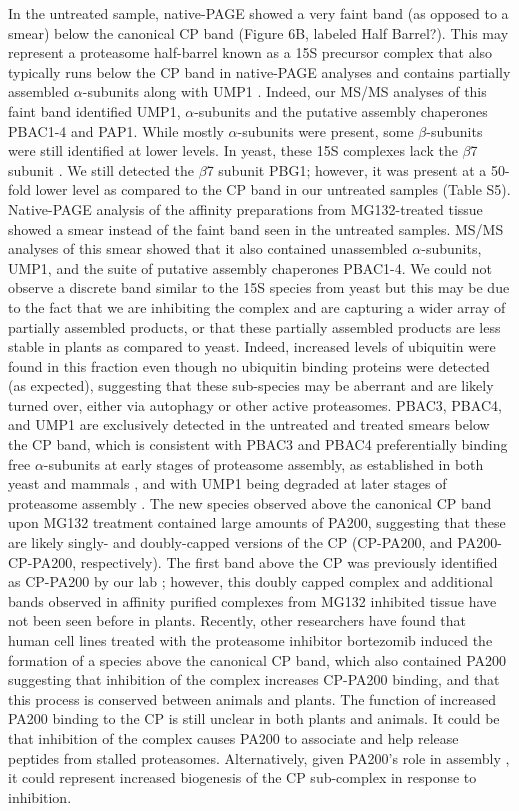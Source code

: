 In the untreated sample, native-PAGE showed a very faint band (as opposed to a smear) below the canonical CP band (Figure 6B, labeled Half Barrel?). This may represent a proteasome half-barrel known as a 15S precursor complex that also typically runs below the CP band in native-PAGE analyses and contains partially assembled $\alpha$-subunits along with UMP1 \citep{kock15}. Indeed, our MS/MS analyses of this faint band identified UMP1, $\alpha$-subunits and the putative assembly chaperones PBAC1-4 and PAP1. While mostly $\alpha$-subunits were present, some $\beta$-subunits were still identified at lower levels. In yeast, these 15S complexes lack the $\beta$7 subunit \citep{kock15}. We still detected the $\beta$7 subunit PBG1; however, it was present at a 50-fold lower level as compared to the CP band in our untreated samples (Table S5). Native-PAGE analysis of the affinity preparations from MG132-treated tissue showed a smear instead of the faint band seen in the untreated samples. MS/MS analyses of this smear showed that it also contained unassembled $\alpha$-subunits, UMP1, and the suite of putative assembly chaperones PBAC1-4. We could not observe a discrete band similar to the 15S species from yeast but this may be due to the fact that we are inhibiting the complex and are capturing a wider array of partially assembled products, or that these partially assembled products are less stable in plants as compared to yeast. Indeed, increased levels of ubiquitin were found in this fraction even though no ubiquitin binding proteins were detected (as expected), suggesting that these sub-species may be aberrant and are likely turned over, either via autophagy or other active proteasomes. PBAC3, PBAC4, and UMP1 are exclusively detected in the untreated and treated smears below the CP band, which is consistent with PBAC3 and PBAC4 preferentially binding free $\alpha$-subunits at early stages of proteasome assembly, as established in both yeast and mammals \citep{kunjappu14}, and with UMP1 being degraded at later stages of proteasome assembly \citep{ramos98}.
	The new species observed above the canonical CP band upon MG132 treatment contained large amounts of PA200, suggesting that these are likely singly- and doubly-capped versions of the CP (CP-PA200, and PA200-CP-PA200, respectively). The first band above the CP was previously identified as CP-PA200 by our lab \citep{book10}; however, this doubly capped complex and additional bands observed in affinity purified complexes from MG132 inhibited tissue have not been seen before in plants. Recently, other researchers have found that human cell lines treated with the proteasome inhibitor bortezomib induced the formation of a species above the canonical CP band, which also contained PA200 \citep{welk16} suggesting that inhibition of the complex increases CP-PA200 binding, and that this process is conserved between animals and plants. The function of increased PA200 binding to the CP is still unclear in both plants and animals. It could be that inhibition of the complex causes PA200 to associate and help release peptides from stalled proteasomes. Alternatively, given PA200’s role in assembly \citep{savulescu11}, it could represent increased biogenesis of the CP sub-complex in response to inhibition.
